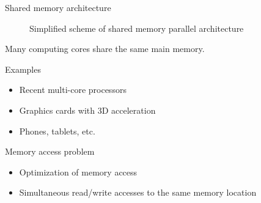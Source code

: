\documentclass[compress,10pt,aspectratio=169]{beamer}
\begin{document}
\begin{frame}[fragile]{Shared memory architecture}
  \scriptsize

 \begin{multicols}{2}
  \begin{figure}[ht]
    \caption{\scriptsize Simplified scheme of shared memory parallel architecture}
  \end{figure}

  Many computing cores share the same main memory.
  
  \begin{exampleblock}{Examples}
    \begin{itemize}
    \item Recent multi-core processors
    \item Graphics cards with 3D acceleration
    \item Phones, tablets, etc.
    \end{itemize}
  \end{exampleblock}

  \begin{alertblock}{Memory access problem}
    \begin{itemize}
    \item Optimization of memory access
    \item Simultaneous read/write accesses to the same memory location
    \end{itemize}
  \end{alertblock}
  
  \end{multicols}
\end{frame}
\end{document}
